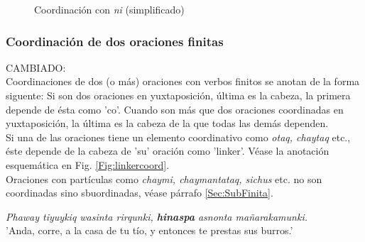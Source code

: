 \documentclass[a4paper,11pt,DIV12]{scrartcl}
\begin{document}
\begin{figure}
\begin{center}
\caption{Coordinaci\'on con {\em ni} (simplificado)}\label{Fig:nicoord}
\end{center}
\end{figure}



\subsubsection{Coordinaci\'on de dos oraciones finitas}
CAMBIADO:\\
Coordinaciones de dos (o m\'as) oraciones con verbos finitos se anotan de la forma siguente: Si son dos oraciones en yuxtaposici\'on, \'ultima es la cabeza, la primera depende de \'esta como 'co'. Cuando son m\'as que dos oraciones coordinadas en yuxtaposici\'on, la \'ultima es la cabeza de la que todas las dem\'as dependen. \\
Si una de las oraciones tiene un elemento coordinativo como {\em otaq, chaytaq} etc., \'este depende de la cabeza de 'su' oraci\'on como 'linker'.  V\'ease la anotaci\'on esquem\'atica en Fig. \ref{Fig:linkercoord}.\\
Oraciones con part\'iculas como \textit{chaymi, chaymantataq, sichus} etc. no son coordinadas sino sbuordinadas, v\'ease p\'arrafo \ref{Sec:SubFinita}.\\


\begin{examples}
  \item {\em Phaway tiyuykiq wasinta rirqunki, \textbf{hinaspa} asnonta ma\~narakamunki.}\\
      'Anda, corre, a la casa de tu t\'io, y entonces te prestas sus burros.'\\
  	\hfill{\small \citep[272]{Cusi2}}
\end{examples}
\end{document}
